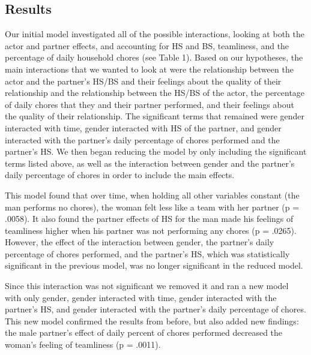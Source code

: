 \documentclass[
  man]{apa6}
\begin{document}
\hypertarget{results-1}{%
\subsection{Results}\label{results-1}}

Our initial model investigated all of the possible interactions, looking at both the actor and partner effects, and accounting for HS and BS, teamliness, and the percentage of daily household chores (see Table 1). Based on our hypotheses, the main interactions that we wanted to look at were the relationship between the actor and the partner's HS/BS and their feelings about the quality of their relationship and the relationship between the HS/BS of the actor, the percentage of daily chores that they and their partner performed, and their feelings about the quality of their relationship. The significant terms that remained were gender interacted with time, gender interacted with HS of the partner, and gender interacted with the partner's daily percentage of chores performed and the partner's HS. We then began reducing the model by only including the significant terms listed above, as well as the interaction between gender and the partner's daily percentage of chores in order to include the main effects.

This model found that over time, when holding all other variables constant (the man performs no chores), the woman felt less like a team with her partner (p = .0058). It also found the partner effects of HS for the man made his feelings of teamliness higher when his partner was not performing any chores (p = .0265). However, the effect of the interaction between gender, the partner's daily percentage of chores performed, and the partner's HS, which was statistically significant in the previous model, was no longer significant in the reduced model.

Since this interaction was not significant we removed it and ran a new model with only gender, gender interacted with time, gender interacted with the partner's HS, and gender interacted with the partner's daily percentage of chores. This new model confirmed the results from before, but also added new findings: the male partner's effect of daily percent of chores performed decreased the woman's feeling of teamliness (p = .0011).
\end{document}
